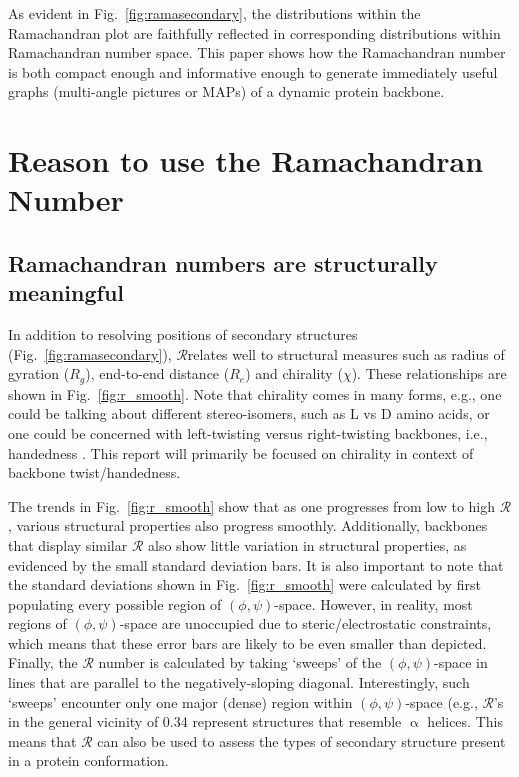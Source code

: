 \documentclass[fleqn,10pt,lineno]{wlpeerj} %
\newcommand{\Fig}[1]{Fig.~\ref{#1}}
\newcommand{\n}[1]{{\color{red}#1}}
\newcommand{\rr}{$\mathcal{R}$\xspace}
\begin{document}

As evident in \Fig{fig:ramasecondary}, the distributions within the Ramachandran plot are faithfully reflected in corresponding distributions within Ramachandran number space. This paper shows how the Ramachandran number is both compact enough and informative enough to generate immediately useful graphs (multi-angle pictures or MAPs) of a dynamic protein backbone.

\section*{Reason to use the Ramachandran Number}

\subsection*{Ramachandran numbers are structurally meaningful}
In addition to resolving positions of secondary structures (\Fig{fig:ramasecondary}), \rr \n{relates} well to structural measures such as radius of gyration ($R_g$), end-to-end distance ($R_e$) and chirality ($\chi$). These relationships are shown in \Fig{fig:r_smooth}. 
\n{Note that chirality comes in many forms, e.g., one could be talking about different stereo-isomers, such as L vs D amino acids, or one could be concerned with left-twisting versus right-twisting backbones, i.e., handedness \cite{Mannige2017}. This report will primarily be focused on chirality in context of backbone twist/handedness.}

\n{The trends in \Fig{fig:r_smooth} show that as one progresses from low to high \rr, various structural properties also progress smoothly. Additionally, backbones that display similar \rr also show little variation in structural properties, as evidenced by the small standard deviation bars. It is also important to note that the standard deviations shown in \Fig{fig:r_smooth} were calculated by first populating every possible region of $(\phi,\psi)$-space. However, in reality, most regions of $(\phi,\psi)$-space are unoccupied due to steric/electrostatic constraints, which means that these error bars are likely to be even smaller than depicted. Finally, the \rr number is calculated by taking `sweeps' of the  $(\phi,\psi)$-space in lines that are parallel to the negatively-sloping diagonal. Interestingly, such `sweeps' encounter only one major (dense) region within $(\phi,\psi)$-space (e.g., $\mathcal{R}$'s in the general vicinity of 0.34 represent structures that resemble $\upalpha$ helices. This means that \rr can also be used to assess the types of secondary structure present in a protein conformation.}
\end{document}
